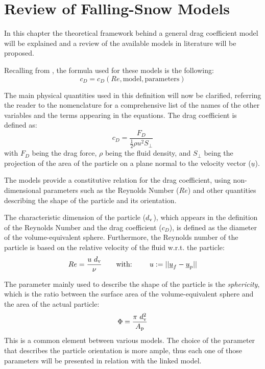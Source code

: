 
\chapter{Review of Falling-Snow Models}
	In this chapter the theoretical framework behind a general drag coefficient model will be explained and a review of the available models in literature will be proposed. 
	
	Recalling from , the formula used for these models is the following:
	\begin{equation}
		c_D = c_D(Re, \text{model}, \text{parameters})
	\end{equation}
	
	The main physical quantities used in this definition will now be clarified, referring the reader to the nomenclature for a comprehensive list of the names of the other variables and the terms appearing in the equations.
	The drag coefficient is defined as:
	\begin{equation}
		c_D = \dfrac{F_D}{\frac{1}{2} \rho u^2 S_{\perp}}
	\end{equation}
	with $ F_D $ being the drag force, $ \rho $ being the fluid density, and $ S_{\perp} $ being the projection of the area of the particle on a plane normal to the velocity vector ($ \underline{u} $).
	
	The models provide a constitutive relation for the drag coefficient, using non-dimensional parameters such as the Reynolds Number ($ Re $) and other quantities describing the shape of the particle and its orientation.
	 
	The characteristic dimension of the particle ($ d_{\textup{v}} $), which appears in the definition of the Reynolds Number and the drag coefficient ($ c_D $), is defined as the diameter of the volume-equivalent sphere. Furthermore, the Reynolds number of the particle is based on the relative velocity of the fluid w.r.t. the particle:
	\begin{equation}
		Re = \dfrac{u \ d_{\textup{v}}}{\nu} \qquad \text{with: } \qquad u := || \underline{u}_f - \underline{u}_p ||
	\end{equation}

	The parameter mainly used to describe the shape of the particle is the \textit{sphericity}, which is the ratio between the surface area of the
	volume-equivalent sphere and the area of the actual particle:
	\begin{equation}
		\Phi = \dfrac{\pi \ d_{\textup{v}}^2} {A_{\textup{p}}}
	\end{equation}
	This is a common element between various models. The choice of the parameter that describes the particle orientation is more ample, thus each one of those parameters will be presented in relation with the linked model.
	
